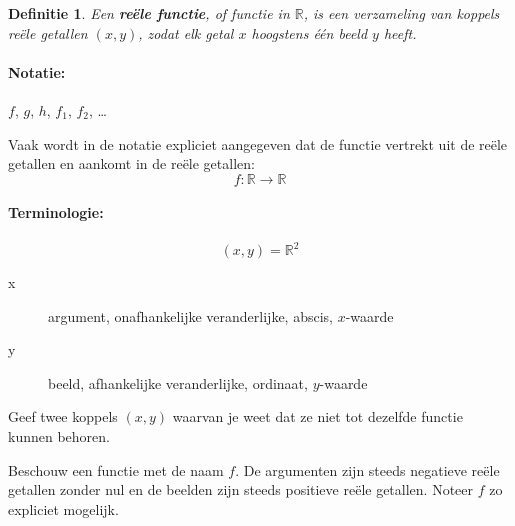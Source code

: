 \documentclass[12pt,twoside]{article}
\newtheorem{definition}{Definitie}
\begin{document}
\begin{theorie}
\begin{definition}
  Een {\bf reële functie}, of functie in $\mathbb{R}$, is een verzameling van {\em koppels} reële getallen $(x,y)$, zodat elk getal $x$ {\em hoogstens één beeld} $y$ heeft.
\end{definition}

\paragraph{Notatie:} $f$, $g$, $h$, $f_1$, $f_2$, \ldots

Vaak wordt in de notatie expliciet aangegeven dat de functie vertrekt uit de reële getallen en aankomt in de reële getallen:
$$f:\mathbb{R}\to\mathbb{R}$$

\paragraph{Terminologie:}
$$(x,y) = \mathbb{R}^2$$
\begin{description}
\item[x] argument, onafhankelijke veranderlijke, abscis, $x$-waarde
\item[y] beeld, afhankelijke veranderlijke, ordinaat, $y$-waarde
\end{description}

\end{theorie}

\begin{oefening}
  Geef twee koppels $(x,y)$ waarvan je weet dat ze niet tot dezelfde functie kunnen behoren.
\end{oefening}

\begin{oefening}
  Beschouw een functie met de naam $f$. De argumenten zijn steeds negatieve reële getallen zonder nul en de beelden zijn steeds positieve reële getallen. Noteer $f$ zo expliciet mogelijk.
\end{oefening}

\pagebreak
\end{document}
